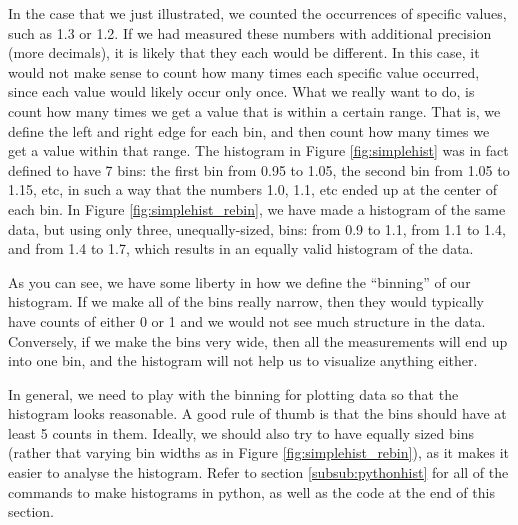 In the case that we just illustrated, we counted the occurrences of specific values, such as 1.3 or 1.2. If we had measured these numbers with additional precision (more decimals), it is likely that they each would be different. In this case, it would not make sense to count how many times each specific value occurred, since each value would likely occur only once. What we really want to do, is count how many times we get a value that is within a certain range. That is, we define the left and right edge for each bin, and then count how many times we get a value within that range. The histogram in Figure \ref{fig:simplehist} was in fact defined to have 7 bins: the first bin from 0.95 to 1.05, the second bin from 1.05 to 1.15, etc, in such a way that the numbers 1.0, 1.1, etc ended up at the center of each bin. In Figure \ref{fig:simplehist_rebin}, we have made a histogram of the same data, but using only three, unequally-sized, bins: from 0.9 to 1.1, from 1.1 to 1.4, and from 1.4 to 1.7, which results in an equally valid histogram of the data. 
 

As you can see, we have some liberty in how we define the ``binning'' of our histogram. If we make all of the bins really narrow, then they would typically have counts of either 0 or 1 and we would not see much structure in the data. Conversely, if we make the bins very wide, then all the measurements will end up into one bin, and the histogram will not help us to  visualize anything either.

In general, we need to play with the binning for plotting data so that the histogram looks reasonable. A good rule of thumb is that the bins should have at least 5 counts in them. Ideally, we should also try to have equally sized bins (rather that varying bin widths as in Figure \ref{fig:simplehist_rebin}), as it makes it easier to analyse the histogram. Refer to section \ref{subsub:pythonhist} for all of the commands to make histograms in python, as well as the code at the end of this section.

